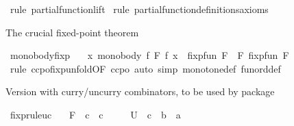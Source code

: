 \begin{isabellebody}
\ {\isacharparenleft}{\kern0pt}rule\ partial{\isacharunderscore}{\kern0pt}function{\isacharunderscore}{\kern0pt}lift{\isacharparenright}{\kern0pt}\isanewline
{}\isamarkupfalse%
\ {\isacharparenleft}{\kern0pt}rule\ partial{\isacharunderscore}{\kern0pt}function{\isacharunderscore}{\kern0pt}definitions{\isacharunderscore}{\kern0pt}axioms{\isacharparenright}{\kern0pt}\isanewline
{}\isamarkupfalse%
%
\endisatagproof
{\isafoldproof}%
%
\isadelimproof
%
\endisadelimproof
%
\begin{isamarkuptext}%
The crucial fixed-point theorem%
\end{isamarkuptext}\isamarkuptrue%
\isamarkupfalse%
\ mono{\isacharunderscore}{\kern0pt}body{\isacharunderscore}{\kern0pt}fixp{\isacharcolon}{\kern0pt}\ \isanewline
\ \ {\isachardoublequoteopen}{\isacharparenleft}{\kern0pt}{\isasymAnd}x{\isachardot}{\kern0pt}\ mono{\isacharunderscore}{\kern0pt}body\ {\isacharparenleft}{\kern0pt}{\isasymlambda}f{\isachardot}{\kern0pt}\ F\ f\ x{\isacharparenright}{\kern0pt}{\isacharparenright}{\kern0pt}\ {\isasymLongrightarrow}\ fixp{\isacharunderscore}{\kern0pt}fun\ F\ {\isacharequal}{\kern0pt}\ F\ {\isacharparenleft}{\kern0pt}fixp{\isacharunderscore}{\kern0pt}fun\ F{\isacharparenright}{\kern0pt}{\isachardoublequoteclose}\isanewline
%
\isadelimproof
%
\endisadelimproof
%
\isatagproof
{}\isamarkupfalse%
\ {\isacharparenleft}{\kern0pt}rule\ ccpo{\isachardot}{\kern0pt}fixp{\isacharunderscore}{\kern0pt}unfold{\isacharbrackleft}{\kern0pt}OF\ ccpo{\isacharbrackright}{\kern0pt}{\isacharparenright}{\kern0pt}\ {\isacharparenleft}{\kern0pt}auto\ simp{\isacharcolon}{\kern0pt}\ monotone{\isacharunderscore}{\kern0pt}def\ fun{\isacharunderscore}{\kern0pt}ord{\isacharunderscore}{\kern0pt}def{\isacharparenright}{\kern0pt}%
\endisatagproof
{\isafoldproof}%
%
\isadelimproof
%
\endisadelimproof
%
\begin{isamarkuptext}%
Version with curry/uncurry combinators, to be used by package%
\end{isamarkuptext}\isamarkuptrue%
\isamarkupfalse%
\ fixp{\isacharunderscore}{\kern0pt}rule{\isacharunderscore}{\kern0pt}uc{\isacharcolon}{\kern0pt}\isanewline
\ \ \ F\ {\isacharcolon}{\kern0pt}{\isacharcolon}{\kern0pt}\ {\isachardoublequoteopen}{\isacharprime}{\kern0pt}c\ {\isasymRightarrow}\ {\isacharprime}{\kern0pt}c{\isachardoublequoteclose}\ \isanewline
\ \ \ \ U\ {\isacharcolon}{\kern0pt}{\isacharcolon}{\kern0pt}\ {\isachardoublequoteopen}{\isacharprime}{\kern0pt}c\ {\isasymRightarrow}\ {\isacharprime}{\kern0pt}b\ {\isasymRightarrow}\ {\isacharprime}{\kern0pt}a{\isachardoublequoteclose}\ \isanewline

\end{isabellebody}
